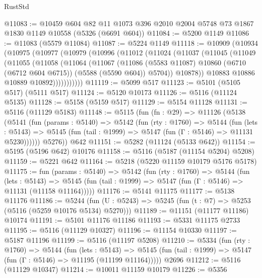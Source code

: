 \begin{lexlean}{RustStd}
\begin{coremodule}
{\begin{coremodule}
{{{{{{{{{{{{{{{{{{{{{{{{{{{{{{{@11083 := @10459
    @604
    @82
    @11
    @1073
    @396
    @2010
    @2004
    @5748
    @73
    @1867
    @1830
    @1149
    @10558
    (@5326 (@6691 @604))
@11084 := @5200 @1149
@11086 := @11083 (@5579 @11084)
@11087 := @5224 @1149
@11118 := @10909
    (@10934
      (@10975
        (@10977
          (@10979
            (@10996
              (@11012
                (@11024
                  (@11037
                    (@11045
                      (@11049
                        (@11055
                          (@11058
                            (@11064
                              (@11067
                                (@11086
                                  (@5583 @11087)
                                  @10860
                                  (@6710 (@6712 @604 @6715))
                                  (@5588 (@5590 @604))
                                  @5704))
                              @10878))
                          @10883
                          @10886
                          @10889
                          @10892)))))))))))
@11119 := @5099 @517
@11123 := @5101 (@5105 @517) (@5111 @517)
@11124 := @5120 @10173
@11126 := @5116 (@11124 @5135)
@11128 := @5158 (@5159 @517)
@11129 := @5154 @11128
@11131 := @5116 (@11129 @5183)
@11148 := @5115
    (fun (fn : @29) =>
    @11126
      (@5138
        (@5141
          (fun (params : @5140) =>
          @5142
            (fun (rty : @1760) =>
            @5144
              (fun (lets : @5143) =>
              @5145 (fun (tail : @1999) => @5147 (fun (Γ : @5146) => @11131 @5230))))))
        @5276))
    @642
@11151 := @5282 (@11124 (@5133 @642))
@11154 := @5195 (@5196 @642) @10176
@11158 := @5116 (@5187 (@11154 @5204) @5208)
@11159 := @5221 @642
@11164 := @5218 (@5220 @11159 @10179 @5176 @5178)
@11175 := fun (params : @5140) =>
  @5142
    (fun (rty : @1760) =>
    @5144
      (fun (lets : @5143) =>
      @5145 (fun (tail : @1999) => @5147 (fun (Γ : @5146) => @11131 (@11158 @11164)))))
@11176 := @5141 @11175
@11177 := @5138 @11176
@11186 := @5244
    (fun (U : @5243) => @5245 (fun (t : @7) => @5253 (@5116 (@5259 @10176 @5134) @5270)))
@11189 := @11151 (@11177 @11186) @10174
@11191 := @5101 @11176 @11186
@11193 := @5331 @11175 @2733
@11195 := @5116 (@11129 @10327)
@11196 := @11154 @10330
@11197 := @5187 @11196
@11199 := @5116 (@11197 @5208)
@11210 := @5334
    (fun (rty : @1760) =>
    @5144
      (fun (lets : @5143) =>
      @5145 (fun (tail : @1999) => @5147 (fun (Γ : @5146) => @11195 (@11199 @11164)))))
    @2696
@11212 := @5116 (@11129 @10347)
@11214 := @10011 @11159 @10179
@11226 := @5356
}}}}}}}}}}}}}}}}}}}}}}}}}}}}}}}
\end{coremodule}}
\end{coremodule}
\end{lexlean}
